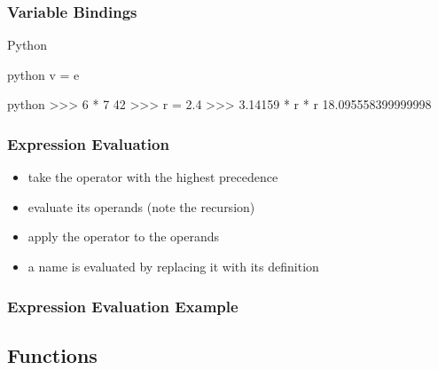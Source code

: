\documentclass[dvipsnames]{beamer}
\theoremstyle{plain}
\begin{document}
\begin{frame}[fragile]
  \frametitle{Variable Bindings}

  \begin{block}{Python}
    \begin{pygments}{python}
v = e
    \end{pygments}
  \end{block}

  \begin{example}
    \begin{pygments}{python}
>>> 6 * 7
42
>>> r = 2.4
>>> 3.14159 * r * r
18.095558399999998
    \end{pygments}
  \end{example}
\end{frame}

\begin{frame}
  \frametitle{Expression Evaluation}

  \begin{itemize}
    \item take the operator with the highest precedence
    \item evaluate its operands (note the recursion)
    \item apply the operator to the operands

    \pause
    \medskip
    \item a name is evaluated by replacing it with its definition
  \end{itemize}
\end{frame}

\begin{frame}
  \frametitle{Expression Evaluation Example}

  \begin{example}

    \pause
    \medskip

    \pause
    \medskip

    \pause
    \medskip
  \end{example}
\end{frame}

\subsection{Functions}
\end{document}
